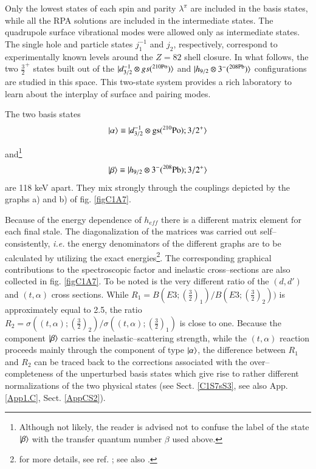 Only the lowest states of each spin and parity $\lambda^{\pi}$ are included in the basis states, while all the RPA solutions are included in the intermediate states. The quadrupole surface vibrational modes were allowed only as intermediate states. The single hole and particle states $j_1^{-1}$ and $j_2$, respectively, correspond to experimentally known levels around the $Z = 82$ shell closure.  
In what follows, the  two $\frac{3}{2}^+$ states built out of the $|{d_{3/2}^{-1}\otimes gs(^{210\text{Po}})} \rangle$ and $|{h_{9/2}\otimes 3^{-}(^{208\text{Pb}})} \rangle$ configurations are studied in this space. This two-state system provides a rich laboratory to learn about the interplay of surface and pairing modes. 

The two basis states 
  \begin{align}\label{eqC1A89} 
   |{\alpha} \rangle\equiv |{d_{3/2}^{-1}\otimes \text{gs}(^{210}\text{Po});3/2^+} \rangle
    \end{align} 


and\footnote{Although not likely, the reader is advised not to confuse the label of the state $|{\beta} \rangle$ with the transfer quantum number $\beta$ used above.}
  \begin{align}\label{eqC1A90} 
      |{\beta} \rangle\equiv |{h_{9/2}\otimes 3^-(^{208}\text{Pb});3/2^+} \rangle
    \end{align} 
are 118 keV apart. They mix strongly through the couplings depicted by the graphs a) and b) of fig. \ref{figC1A7}. 


Because of the energy dependence of $h_{eff}$ there is a different matrix element 
for each final stale. The diagonalization of the matrices was carried out self--consistently, \textit{i.e.} the energy denominators of the different graphs are to be calculated by utilizing the exact energies\footnote{for more details, see ref. \cite{Bortignon:77}; see also \cite{Bortignon:76}.}. 
The corresponding graphical contributions to the spectroscopic factor and inelastic cross--sections are also collected in fig. \ref{figC1A7}. To be noted is the very different ratio of the $(d,d')$ and $(t,\alpha)$ cross sections. While $R_1=B(E3;(\frac{3}{2})_1)/B(E3;(\frac{3}{2})_2))$ is approximately equal to 2.5, the ratio $R_2=\sigma((t,\alpha);(\frac{3}{2})_2)/\sigma((t,\alpha);(\frac{3}{2})_1)$ is close to one. Because the component $|{\beta} \rangle$ carries the inelastic--scattering strength, while the $(t,\alpha)$ reaction proceeds mainly through the component of type $|{\alpha} \rangle$, the difference between $R_1$ and $R_2$ can be traced back to the corrections associated with the over--completeness of the unperturbed basis states which give rise to rather different normalizations of the two physical states (see Sect. \ref{C1S7sS3}, see also App. \ref{App1.C}, Sect. \ref{AppCS2}).
